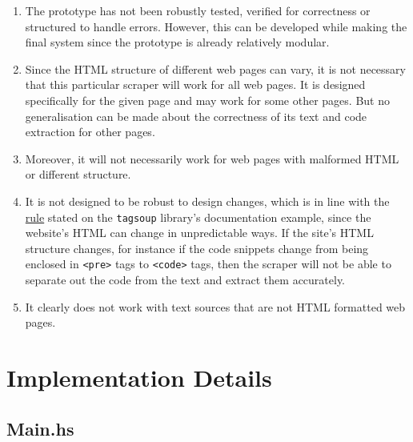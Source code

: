 \documentclass{scrreprt}
\begin{document}
\begin{enumerate}
            \item The prototype has not been robustly tested, verified for correctness or structured to handle errors. However, this can be developed while making the final system since the prototype is already relatively modular.
            \item Since the HTML structure of different web pages can vary, it is not necessary that this particular scraper will work for all web pages. It is designed specifically for the given page and may work for some other pages. But no generalisation can be made about the correctness of its text and code extraction for other pages.
            \item Moreover, it will not necessarily work for web pages with malformed HTML or different structure.
            \item It is not designed to be robust to design changes, which is in line with the \href{https://hackage.haskell.org/package/tagsoup-0.6/src/tagsoup.htm#:~:text=Rule%202%3A%0ADo%20not%20be%20robust%20to%20design%20changes%2C%20do%20not%20even%20consider%20the%20possibility%20when%20writing%20the%20code.}{rule} stated on the \texttt{tagsoup} library's documentation example, since the website's HTML can change in unpredictable ways. If the site's HTML structure changes, for instance if the code snippets change from being enclosed in \texttt{<pre>} tags to \texttt{<code>} tags, then the scraper will not be able to separate out the code from the text and extract them accurately.
            \item It clearly does not work with text sources that are not HTML formatted web pages.
\end{enumerate}



\section{Implementation Details}


\subsection{Main.hs}
\end{document}
